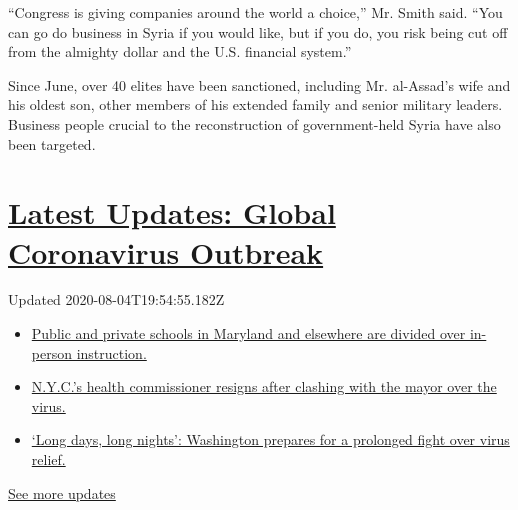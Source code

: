 ``Congress is giving companies around the world a choice,'' Mr. Smith
said. ``You can go do business in Syria if you would like, but if you
do, you risk being cut off from the almighty dollar and the U.S.
financial system.''

Since June, over 40 elites have been sanctioned, including Mr.
al-Assad's wife and his oldest son, other members of his extended family
and senior military leaders. Business people crucial to the
reconstruction of government-held Syria have also been targeted.

\hypertarget{latest-updates-global-coronavirus-outbreak}{%
\section{\texorpdfstring{\href{https://www.nytimes3xbfgragh.onion/2020/08/04/world/coronavirus-cases.html?action=click\&pgtype=Article\&state=default\&region=MAIN_CONTENT_1\&context=storylines_live_updates}{Latest
Updates: Global Coronavirus
Outbreak}}{Latest Updates: Global Coronavirus Outbreak}}\label{latest-updates-global-coronavirus-outbreak}}

Updated 2020-08-04T19:54:55.182Z

\begin{itemize}
\tightlist
\item
  \href{https://www.nytimes3xbfgragh.onion/2020/08/04/world/coronavirus-cases.html?action=click\&pgtype=Article\&state=default\&region=MAIN_CONTENT_1\&context=storylines_live_updates\#link-4825b93}{Public
  and private schools in Maryland and elsewhere are divided over
  in-person instruction.}
\item
  \href{https://www.nytimes3xbfgragh.onion/2020/08/04/world/coronavirus-cases.html?action=click\&pgtype=Article\&state=default\&region=MAIN_CONTENT_1\&context=storylines_live_updates\#link-4d1eafa8}{N.Y.C.'s
  health commissioner resigns after clashing with the mayor over the
  virus.}
\item
  \href{https://www.nytimes3xbfgragh.onion/2020/08/04/world/coronavirus-cases.html?action=click\&pgtype=Article\&state=default\&region=MAIN_CONTENT_1\&context=storylines_live_updates\#link-6b644638}{`Long
  days, long nights': Washington prepares for a prolonged fight over
  virus relief.}
\end{itemize}

\href{https://www.nytimes3xbfgragh.onion/2020/08/04/world/coronavirus-cases.html?action=click\&pgtype=Article\&state=default\&region=MAIN_CONTENT_1\&context=storylines_live_updates}{See
more updates}


